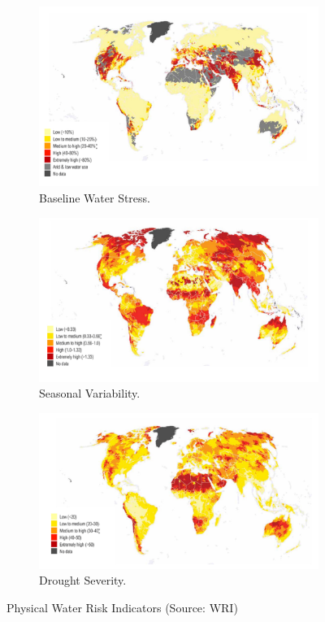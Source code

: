 \documentclass[a4paper]{article}
\begin{document}
\begin{figure}
\centering
\begin{subfigure}[b]{0.31\textwidth}
                \centering
            \includegraphics[width=\textwidth]{plots/bws_v1.pdf}
  \caption{Baseline Water Stress.}  \label{fig:bws}
        \end{subfigure}
\centering      
\begin{subfigure}[b]{0.31\textwidth}                  
       \includegraphics[width=\textwidth]{plots/sv_v1.pdf}
  \caption{Seasonal Variability.}\label{fig:sv}
        \end{subfigure}
\centering
\begin{subfigure}[b]{0.31\textwidth}                  
       \includegraphics[width=\textwidth]{plots/ds_v1.pdf}
  \caption{Drought Severity.}\label{fig:ds}
        \end{subfigure}
\caption{Physical Water Risk Indicators (Source: WRI)}      
        \label{fig:Physical_indicators}
\end{figure}
\end{document}
